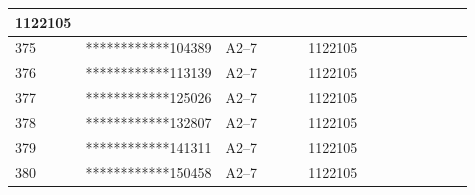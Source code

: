 \documentclass[UTF8,10pt,a4paper,fontset=fandol]{ctexart}
\newcommand{\fieldvalue}[1]{#1}
\begin{document}
\begin{center}
\begin{tabular}{|p{0.08\linewidth}|p{0.29\linewidth}|p{0.18\linewidth}|p{0.18\linewidth}|p{0.18\linewidth}|}
\fieldvalue{1122105}
& \\ \hline
\fieldvalue{375}
&
\fieldvalue{************104389}
&
\fieldvalue{A2--7}
&
\fieldvalue{1122105}
& \\ \hline
\fieldvalue{376}
&
\fieldvalue{************113139}
&
\fieldvalue{A2--7}
&
\fieldvalue{1122105}
& \\ \hline
\fieldvalue{377}
&
\fieldvalue{************125026}
&
\fieldvalue{A2--7}
&
\fieldvalue{1122105}
& \\ \hline
\fieldvalue{378}
&
\fieldvalue{************132807}
&
\fieldvalue{A2--7}
&
\fieldvalue{1122105}
& \\ \hline
\fieldvalue{379}
&
\fieldvalue{************141311}
&
\fieldvalue{A2--7}
&
\fieldvalue{1122105}
& \\ \hline
\fieldvalue{380}
&
\fieldvalue{************150458}
&
\fieldvalue{A2--7}
&
\fieldvalue{1122105}
& \\ \hline

\end{tabular}
\end{center}
\end{document}
